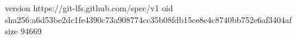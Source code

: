 version https://git-lfs.github.com/spec/v1
oid sha256:a6d53be2dc1fe4390c73a908774cc35b08fdb15ce8e4c8740bb752e6af3404af
size 94669
